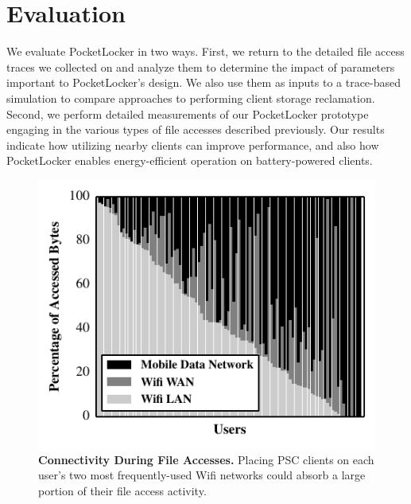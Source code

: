 
\section{Evaluation}
\label{sec-evaluation}

We evaluate PocketLocker in two ways. First, we return to the detailed file
access traces we collected on \PhoneLab{} and analyze them to determine the
impact of parameters important to PocketLocker's design. We also use them as
inputs to a trace-based simulation to compare approaches to performing client
storage reclamation. Second, we perform detailed measurements of our
PocketLocker prototype engaging in the various types of file accesses
described previously. Our results indicate how utilizing nearby clients can
improve performance, and also how PocketLocker enables energy-efficient
operation on battery-powered clients.

\begin{figure}[t]

  \includegraphics[width=\columnwidth]{./figures/pocketlocker/ConnectivityPercentageGraph.pdf}

  \caption{\small \textbf{Connectivity During File Accesses.} Placing PSC
    clients on each user's two most frequently-used Wifi networks could absorb a
  large portion of their file access activity.}

  \label{fig-simulation-connectivity}

\end{figure}

